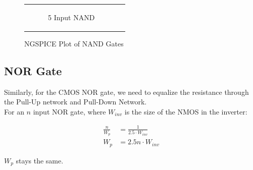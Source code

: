 \documentclass[conference]{IEEEtran}
\begin{document}
\begin{figure}[H]
\begin{tabular}{cc}
\begin{subfigure}{0.44\linewidth}
            \caption{5 Input NAND}
        \end{subfigure}
    \end{tabular}
    \caption{NGSPICE Plot of NAND Gates}
\end{figure}

\subsection{NOR Gate}

Similarly, for the CMOS NOR gate, we need to equalize the resistance through the Pull-Up network and Pull-Down Network. \\
For an $n$ input NOR gate, where $W_{inv}$ is the size of the NMOS in the inverter:

\begin{align}
    \frac{n}{W_p} &= \frac{1}{2.5 \cdot W_{inv}} \\
    W_p &= 2.5  n \cdot W_{inv}
\end{align}

$W_p$ stays the same.
\end{document}
